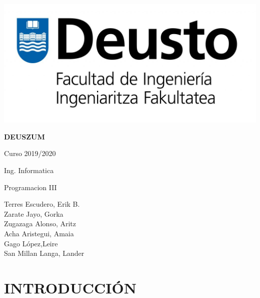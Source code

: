 \documentclass{article}
\theoremstyle{definition}
\begin{document}
\begin{titlepage}
	\begin{center}
	    \includegraphics[scale = 0.5]{LogoIngenieriaR.jpg}\\[1.0 cm]
	\end{center}
	
    \vspace*{150pt}
    \centering
    {\Huge
     \textbf{DEUSZUM}
    }
    
	\vspace*{120pt}
	
	\begin{flushright}
	{\Large Curso 2019/2020}
	\end{flushright}
	\begin{flushright}
	{\LARGE Ing. Informatica}
	\end{flushright}
	\begin{flushright}
	{\Large Programacion III}
	\end{flushright}
	
	\begin{flushright} 
		    Terres Escudero, Erik B.  \\
		    Zarate Jayo, Gorka \\
		    Zugazaga Alonso, Aritz \\
		    Acha Aristegui, Amaia\\
		    Gago López,Leire \\
		    San Millan Langa, Lander
		    
	\end{flushright}
    
	
\end{titlepage}

\tableofcontents

\clearpage

\section{INTRODUCCIÓN}
\end{document}
